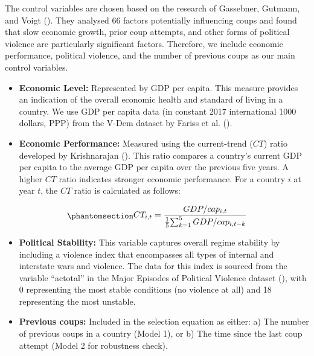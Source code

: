 \documentclass[
  12pt,
]{report}
\providecommand{\tightlist}{%
  \setlength{\itemsep}{0pt}\setlength{\parskip}{0pt}}\usepackage{longtable,booktabs,array}
\begin{document}
The control variables are chosen based on the research of Gassebner,
Gutmann, and Voigt (). They analysed
66 factors potentially influencing coups and found that slow economic
growth, prior coup attempts, and other forms of political violence are
particularly significant factors. Therefore, we include economic
performance, political violence, and the number of previous coups as our
main control variables.

\begin{itemize}
\tightlist
\item
  \textbf{Economic Level:} Represented by GDP per capita. This measure
  provides an indication of the overall economic health and standard of
  living in a country. We use GDP per capita data (in constant 2017
  international 1000 dollars, PPP) from the V-Dem dataset by Fariss et
  al. ().
\item
  \textbf{Economic Performance:} Measured using the current-trend
  (\(CT\)) ratio developed by Krishnarajan
  (). This ratio compares a
  country's current GDP per capita to the average GDP per capita over
  the previous five years. A higher \(CT\) ratio indicates stronger
  economic performance. For a country \(i\) at year \(t\), the \(CT\)
  ratio is calculated as follows:
\end{itemize}

\begin{equation}\phantomsection\label{eq-eq6}{
    \begin{aligned}
    CT_{i,t} = {GDP/cap_{i,t} \over {1 \over 5} {\sum_{k=1}^5GDP/cap_{i,t-k}}}
    \end{aligned}
}\end{equation}

\begin{itemize}
\tightlist
\item
  \textbf{Political Stability:} This variable captures overall regime
  stability by including a violence index that encompasses all types of
  internal and interstate wars and violence. The data for this index is
  sourced from the variable ``actotal'' in the Major Episodes of
  Political Violence dataset
  (), with 0
  representing the most stable conditions (no violence at all) and 18
  representing the most unstable.
\item
  \textbf{Previous coups:} Included in the selection equation as either:
  a) The number of previous coups in a country (Model 1), or b) The time
  since the last coup attempt (Model 2 for robustness check).
\end{itemize}
\end{document}
